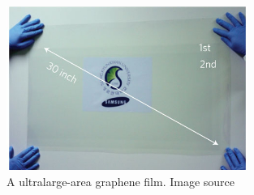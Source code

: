 \begin{figure}[htbp!] 
\centering  
\includegraphics[width=0.7\textwidth]{30-inches-gr.jpg}
\caption{A ultralarge-area graphene film. Image source \cite{Bae2010}}  
\label{fig:30gr}
\end{figure} 

